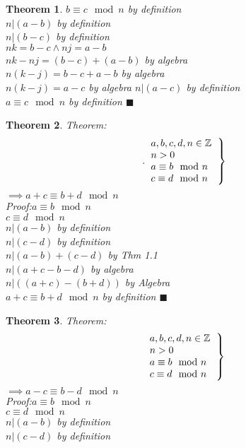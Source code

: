 \documentclass{article}
\newtheorem{theorem}{Theorem}[section]
\begin{document}
\begin{theorem}
$b \equiv c \mod{n}$ by definition\\
$n|(a-b)$ by definition\\
$n|(b-c)$ by definition\\
$nk=b-c \land nj=a-b$\\
$nk-nj=(b-c)+(a-b)$ by algebra\\
$n(k-j)=b-c+a-b$ by algebra\\
$n(k-j)=a-c$ by algebra
$n|(a-c)$ by definition\\
$a \equiv c \mod{n}$ by definition $\blacksquare$\\
\end{theorem}\begin{theorem}	
	Theorem:
	\[
		\left . .
		\begin{tabular}{l}
			$a,b,c,d,n \in \mathbb{Z}$\\
			$n > 0$\\
			$a \equiv b \mod{n}$\\
			$c \equiv d \mod{n}$\\
		\end{tabular}
	\right \}
\]
$\implies a+c \equiv b+d \mod{n}$\\
Proof:$a \equiv b \mod{n}$\\
$c \equiv d \mod{n}$\\
$n|(a-b)$ by definition\\
$n|(c-d)$ by definition\\
$n|(a-b)+(c-d)$ by Thm 1.1\\
$n|(a+c-b-d)$ by algebra\\
$n|((a+c)-(b+d))$ by Algebra\\
$a+c \equiv b+d \mod{n}$ by definition $\blacksquare$\\
\end{theorem}\begin{theorem}
	Theorem:
	\[\left .
		\begin{tabular}{l}
			$a,b,c,d,n \in \mathbb{Z}$\\
			$n > 0$\\
			$a \equiv b \mod{n}$\\
			$c \equiv d \mod{n}$\\
		\end{tabular}
	\right \}\]
$\implies a-c \equiv b-d \mod{n}$\\
Proof:$a \equiv b \mod{n}$\\
$c \equiv d \mod{n}$\\
$n|(a-b)$ by definition\\
$n|(c-d)$ by definition\\

\end{theorem}
\end{document}
